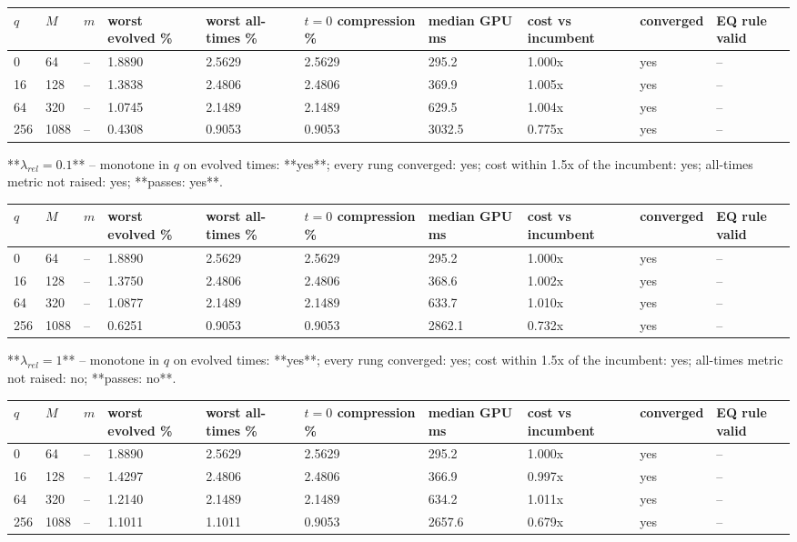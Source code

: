 \documentclass[11pt]{article}
\begin{document}
\begin{table}[htbp]\centering\small
\begin{tabular}{llllllllll}\hline
$q$ & $M$ & $m$ & worst evolved \% & worst all-times \% & $t=0$ compression \% & median GPU ms & cost vs incumbent & converged & EQ rule valid \\ \hline
0 & 64 & -- & 1.8890 & 2.5629 & 2.5629 & 295.2 & 1.000x & yes & -- \\
16 & 128 & -- & 1.3838 & 2.4806 & 2.4806 & 369.9 & 1.005x & yes & -- \\
64 & 320 & -- & 1.0745 & 2.1489 & 2.1489 & 629.5 & 1.004x & yes & -- \\
256 & 1088 & -- & 0.4308 & 0.9053 & 0.9053 & 3032.5 & 0.775x & yes & -- \\
\hline\end{tabular}
\end{table}
**$\lambda_{rel} = 0.1$** -- monotone in $q$ on evolved times: **yes**; every rung converged: yes; cost within 1.5x of the incumbent: yes; all-times metric not raised: yes; **passes: yes**.

\begin{table}[htbp]\centering\small
\begin{tabular}{llllllllll}\hline
$q$ & $M$ & $m$ & worst evolved \% & worst all-times \% & $t=0$ compression \% & median GPU ms & cost vs incumbent & converged & EQ rule valid \\ \hline
0 & 64 & -- & 1.8890 & 2.5629 & 2.5629 & 295.2 & 1.000x & yes & -- \\
16 & 128 & -- & 1.3750 & 2.4806 & 2.4806 & 368.6 & 1.002x & yes & -- \\
64 & 320 & -- & 1.0877 & 2.1489 & 2.1489 & 633.7 & 1.010x & yes & -- \\
256 & 1088 & -- & 0.6251 & 0.9053 & 0.9053 & 2862.1 & 0.732x & yes & -- \\
\hline\end{tabular}
\end{table}
**$\lambda_{rel} = 1$** -- monotone in $q$ on evolved times: **yes**; every rung converged: yes; cost within 1.5x of the incumbent: yes; all-times metric not raised: no; **passes: no**.

\begin{table}[htbp]\centering\small
\begin{tabular}{llllllllll}\hline
$q$ & $M$ & $m$ & worst evolved \% & worst all-times \% & $t=0$ compression \% & median GPU ms & cost vs incumbent & converged & EQ rule valid \\ \hline
0 & 64 & -- & 1.8890 & 2.5629 & 2.5629 & 295.2 & 1.000x & yes & -- \\
16 & 128 & -- & 1.4297 & 2.4806 & 2.4806 & 366.9 & 0.997x & yes & -- \\
64 & 320 & -- & 1.2140 & 2.1489 & 2.1489 & 634.2 & 1.011x & yes & -- \\
256 & 1088 & -- & 1.1011 & 1.1011 & 0.9053 & 2657.6 & 0.679x & yes & -- \\
\hline\end{tabular}
\end{table}
\end{document}
